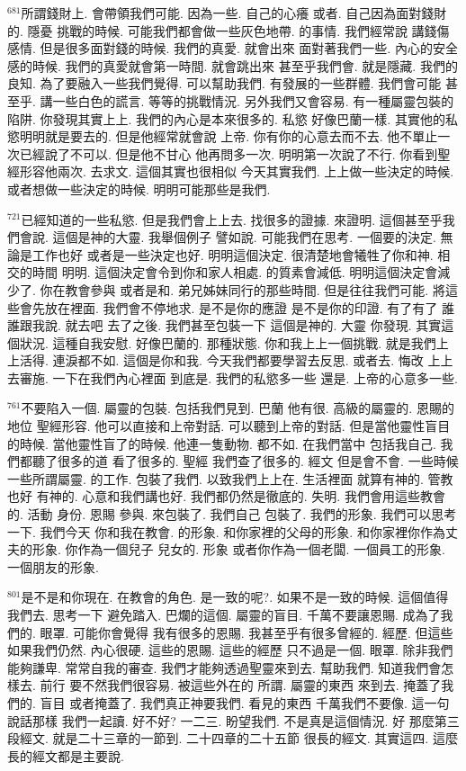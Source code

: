 \documentclass{book}
\begin{document}
$^{681}$所謂錢財上.
會帶領我們可能.
因為一些.
自己的心癢 或者.
自己因為面對錢財的.
隱憂 挑戰的時候.
可能我們都會做一些灰色地帶.
的事情.
我們經常說 講錢傷感情.
但是很多面對錢的時候.
我們的真愛.
就會出來 面對著我們一些.
內心的安全感的時候.
我們的真愛就會第一時間.
就會跳出來 甚至乎我們會.
就是隱藏.
我們的良知.
為了要融入一些我們覺得.
可以幫助我們.
有發展的一些群體.
我們會可能 甚至乎.
講一些白色的謊言.
等等的挑戰情況.
另外我們又會容易.
有一種屬靈包裝的陷阱.
你發現其實上上.
我們的內心是本來很多的.
私慾 好像巴蘭一樣.
其實他的私慾明明就是要去的.
但是他經常就會說 上帝.
你有你的心意去而不去.
他不單止一次已經說了不可以.
但是他不甘心 他再問多一次.
明明第一次說了不行.
你看到聖經形容他兩次.
去求文.
這個其實也很相似 今天其實我們.
上上做一些決定的時候.
或者想做一些決定的時候.
明明可能那些是我們.

$^{721}$已經知道的一些私慾.
但是我們會上上去.
找很多的證據.
來證明.
這個甚至乎我們會說.
這個是神的大靈.
我舉個例子 譬如說.
可能我們在思考.
一個要的決定.
無論是工作也好 或者是一些決定也好.
明明這個決定.
很清楚地會犧牲了你和神.
相交的時間 明明.
這個決定會令到你和家人相處.
的質素會減低.
明明這個決定會減少了.
你在教會參與 或者是和.
弟兄姊妹同行的那些時間.
但是往往我們可能.
將這些會先放在裡面.
我們會不停地求.
是不是你的應證 是不是你的印證.
有了有了 誰誰跟我說.
就去吧 去了之後.
我們甚至包裝一下 這個是神的.
大靈 你發現.
其實這個狀況.
這種自我安慰.
好像巴蘭的.
那種狀態.
你和我上上一個挑戰.
就是我們上上活得.
連淚都不如.
這個是你和我.
今天我們都要學習去反思.
或者去.
悔改 上上去審施.
一下在我們內心裡面 到底是.
我們的私慾多一些 還是.
上帝的心意多一些.

$^{761}$不要陷入一個.
屬靈的包裝.
包括我們見到.
巴蘭 他有很.
高級的屬靈的.
恩賜的地位 聖經形容.
他可以直接和上帝對話.
可以聽到上帝的對話.
但是當他靈性盲目的時候.
當他靈性盲了的時候.
他連一隻動物.
都不如.
在我們當中 包括我自己.
我們都聽了很多的道 看了很多的.
聖經 我們查了很多的.
經文 但是會不會.
一些時候 一些所謂屬靈.
的工作.
包裝了我們.
以致我們上上在.
生活裡面 就算有神的.
管教也好 有神的.
心意和我們講也好.
我們都仍然是徹底的.
失明.
我們會用這些教會的.
活動 身份.
恩賜 參與.
來包裝了.
我們自己 包裝了.
我們的形象.
我們可以思考一下.
我們今天 你和我在教會.
的形象.
和你家裡的父母的形象.
和你家裡你作為丈夫的形象.
你作為一個兒子 兒女的.
形象 或者你作為一個老闆.
一個員工的形象.
一個朋友的形象.

$^{801}$是不是和你現在.
在教會的角色.
是一致的呢?.
如果不是一致的時候.
這個值得我們去.
思考一下 避免踏入.
巴爛的這個.
屬靈的盲目.
千萬不要讓恩賜.
成為了我們的.
眼罩.
可能你會覺得 我有很多的恩賜.
我甚至乎有很多曾經的.
經歷.
但這些 如果我們仍然.
內心很硬.
這些的恩賜.
這些的經歷 只不過是一個.
眼罩.
除非我們能夠謙卑.
常常自我的審查.
我們才能夠透過聖靈來到去.
幫助我們.
知道我們會怎樣去.
前行 要不然我們很容易.
被這些外在的 所謂.
屬靈的東西 來到去.
掩蓋了我們的.
盲目 或者掩蓋了.
我們真正神要我們.
看見的東西 千萬我們不要像.
這一句說話那樣 我們一起讀.
好不好? 一二三.
盼望我們.
不是真是這個情況.
好 那麼第三段經文.
就是二十三章的一節到.
二十四章的二十五節 很長的經文.
其實這四.
這麼長的經文都是主要說.
\end{document}
